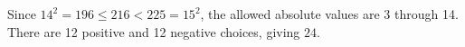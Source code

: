 Since $14^2=196\le216<225=15^2$, the allowed absolute values are 3 through 14. There are 12 positive and 12 negative choices, giving $\boxed{24}$.
